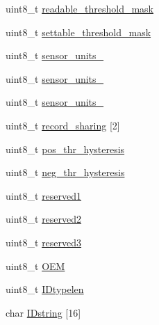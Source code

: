 \begin{DoxyCompactItemize}
\item 
uint8\-\_\-t \hyperlink{structSDR__type__02h__t_a8e2a02bf6ad07c55314b48f27585a570}{readable\-\_\-threshold\-\_\-mask}
\item 
uint8\-\_\-t \hyperlink{structSDR__type__02h__t_af6525580f5a554ff42c4ae6e5f79e9b1}{settable\-\_\-threshold\-\_\-mask}
\item 
uint8\-\_\-t \hyperlink{structSDR__type__02h__t_a2bd08b6444ef366b59215a93283f8242}{sensor\-\_\-units\-\_}
\item 
uint8\-\_\-t \hyperlink{structSDR__type__02h__t_a7403f1365f38c7fa4eecd0ecda4aaa24}{sensor\-\_\-units\-\_}
\item 
uint8\-\_\-t \hyperlink{structSDR__type__02h__t_af6b2fbda3214a51fc10399511d74a82d}{sensor\-\_\-units\-\_}
\item 
uint8\-\_\-t \hyperlink{structSDR__type__02h__t_aeee9ad9db6f3fd67076295fbe49083ea}{record\-\_\-sharing} \mbox{[}2\mbox{]}
\item 
uint8\-\_\-t \hyperlink{structSDR__type__02h__t_ab798a4a5f84436307789b005299b9abd}{pos\-\_\-thr\-\_\-hysteresis}
\item 
uint8\-\_\-t \hyperlink{structSDR__type__02h__t_ad604e1203bb2e1dbe3cbc44a3123ce0e}{neg\-\_\-thr\-\_\-hysteresis}
\item 
uint8\-\_\-t \hyperlink{structSDR__type__02h__t_a4e6f4e8611e5ee10ac216c4dd599bc4b}{reserved1}
\item 
uint8\-\_\-t \hyperlink{structSDR__type__02h__t_a312451040c680c7492910cb6fcc6f901}{reserved2}
\item 
uint8\-\_\-t \hyperlink{structSDR__type__02h__t_a0e98b1704c37eca39cbbc070a0a44a53}{reserved3}
\item 
uint8\-\_\-t \hyperlink{structSDR__type__02h__t_a5fcc55f01ac42a640c542031d69c42f6}{O\-E\-M}
\item 
uint8\-\_\-t \hyperlink{structSDR__type__02h__t_a1446fee65fc7bc12fc8516ed7381774d}{I\-Dtypelen}
\item 
char \hyperlink{structSDR__type__02h__t_a77b2867a0314bb22b71c5df6c1e10be3}{I\-Dstring} \mbox{[}16\mbox{]}
\end{DoxyCompactItemize}


